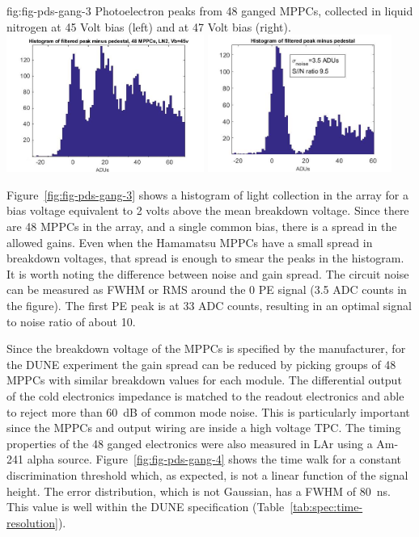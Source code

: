 \begin{dunefigure}
 {fig:fig-pds-gang-3}
 {Photoelectron peaks from 48 ganged MPPCs, collected in liquid nitrogen at 45 Volt bias (left) and at 47 Volt bias (right).}
\includegraphics[height=4.5cm]{graphics/pds-gang48-45v.jpg}
\includegraphics[height=4.5cm]{graphics/pds-gang48-47v.jpg}
\end{dunefigure}

Figure~\ref{fig:fig-pds-gang-3} shows a histogram of light collection in the array for a bias voltage equivalent to 2 volts above the mean breakdown voltage. Since there are 48 MPPCs in the array, and a single common bias, there is a spread in the allowed gains. Even when the Hamamatsu MPPCs have a small spread in breakdown voltages, that spread is enough to smear the peaks in the histogram. It is worth noting the difference between noise and gain spread. The circuit noise can be measured as FWHM or RMS around the 0 PE signal (3.5 ADC counts in the figure). The first PE peak is at 33 ADC counts, resulting in an optimal signal to noise ratio of about 10.

Since the breakdown voltage of the MPPCs is specified by the manufacturer, for the DUNE experiment the gain spread can be reduced by picking groups of 48 MPPCs with similar breakdown values for each module. The differential output of the cold electronics impedance is matched to the readout electronics and able to reject more than \SI{60}{dB} of common mode noise. This is particularly important since the MPPCs and output wiring are inside a high voltage TPC. The timing properties of the 48 ganged electronics were also measured 
in LAr using a Am-241 alpha source. 
Figure~\ref{fig:fig-pds-gang-4} shows the time walk for a constant discrimination threshold which, 
as expected, is not a linear function of the signal height. The error distribution, which is not Gaussian, has a FWHM of \SI{80}{ns}. This value is well within the DUNE specification (Table~\ref{tab:spec:time-resolution}).

